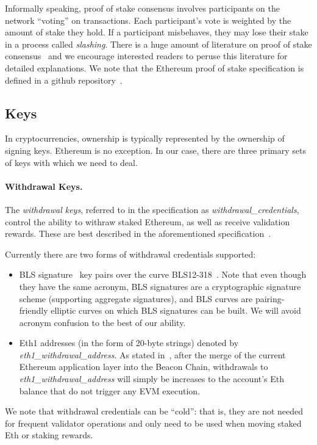Informally speaking, proof of stake consensus involves participants on the network ``voting'' on transactions.  Each participant's vote is weighted by the amount of stake they hold.  If a participant misbehaves, they may lose their stake in a process called \emph{slashing}.  There is a huge amount of literature on proof of stake consensus~\cite{buterin2017casper,C:KRDO17,FC:DaiPasShi19} and we encourage interested readers to peruse this literature for detailed explanations.  We note that the Ethereum proof of stake specification is defined in a github repository~\cite{EthVal}.

\subsection{Keys}
In cryptocurrencies, ownership is typically represented by the ownership of signing keys.  Ethereum is no exception.  In our case, there are three primary sets of keys with which we need to deal.

\paragraph{Withdrawal Keys.}  The \emph{withdrawal keys}, referred to in the specification as \emph{withdrawal\_credentials}, control the ability to withraw staked Ethereum, as well as receive validation rewards.  These are best described in the aforementioned specification~\cite{EthVal}.

Currently there are two forms of withdrawal credentials supported:
\begin{itemize}
\item BLS signature~\cite{AC:BonLynSha01} key pairs over the curve BLS12-318~\cite{barreto2002constructing,BLS12-318}.  Note that even though they have the same acronym, BLS signatures are a cryptographic signature scheme (supporting aggregate signatures), and BLS curves are pairing-friendly elliptic curves on which BLS signatures can be built.  We will avoid acronym confusion to the best of our ability.
\item Eth1 addresses (in the form of 20-byte strings) denoted by \emph{eth1\_withdrawal\_address}.  As stated in~\cite{EthVal}, after the merge of the current Ethereum application layer into the Beacon Chain, withdrawals to \emph{eth1\_withdrawal\_address} will simply be increases to the account's Eth balance that do not trigger any EVM execution.
\end{itemize}

We note that withdrawal credentials can be ``cold'':  that is, they are not needed for frequent validator operations and only need to be used when moving staked Eth or staking rewards.

